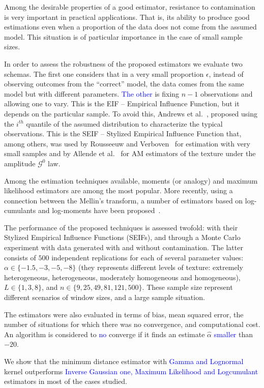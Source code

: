 \documentclass[a4paper]{article} %
\begin{document}
Among the desirable properties of a good estimator, resistance to contamination is very important in practical applications. 
That is, its ability to produce good estimations even when a proportion of the data does not come from the assumed model. 
This situation is of particular importance in the case of small sample sizes.

In order to assess the robustness of the proposed estimators we evaluate two schemas. 
The first one considers that in a very small proportion $\epsilon$, instead of observing outcomes from the ``correct'' model, the data comes from the same model but with different parameters.
\textcolor{blue}{The other} is fixing $n-1$ observations and allowing one to vary. 
This is the EIF -- Empirical Influence Function, but it depends on the particular sample.
To avoid this, Andrews et al.~\cite{Andrews1972}, proposed using the $i^{th}$ quantile of the assumed distribution to characterize the typical observations.
This is the SEIF -- Stylized Empirical Influence Function that, among others, was used by Rousseeuw and Verboven~\cite{RousseeuwCSDA} for estimation with very small samples and by Allende et al.~\cite{AllendeFreryetal:JSCS:05} for AM estimators of the texture under the amplitude $\mathcal G^0$ law.

Among the estimation techniques available, moments (or analogy) and maximum likelihood estimators are among the most popular.  
More recently, using a connection between the Mellin's transform, a number of estimators based on log-cumulants  and log-moments have been proposed~\cite{MellinAnalysisPolSAR,BujorTrouveValetNicolas2004,khan2014}.

The performance of the proposed techniques is assessed twofold: with their Stylized Empirical Influence Functions (SEIFs), and through a Monte Carlo experiment with data generated with and without contamination. 
The latter consists of $500$ independent replications for each of several parameter values: 
$\alpha\in\{-1.5, -3, -5, -8\}$ (they represents different levels of texture: extremely heterogeneous, heterogeneous, moderately homogeneous and homogeneous), 
$L\in\{1,3,8\}$, and 
$n\in\{9, 25,49, 81,121,500\}$. 
These sample size represent different scenarios of window sizes, and a large sample situation.

The estimators were also evaluated in terms of bias, mean squared error, the number of situations for which there was no convergence, and computational cost. 
An algorithm is considered to \textcolor{blue}{no} converge if it finds an estimate $\widehat{\alpha}$ \textcolor{blue}{smaller} than $-20$.

We show that the minimum distance estimator with \textcolor{blue}{Gamma  and Lognormal} kernel outperforms \textcolor{blue}{Inverse Gaussian one, Maximum Likelihood and Logcumulant} estimators in most of the cases studied.



\end{document}
